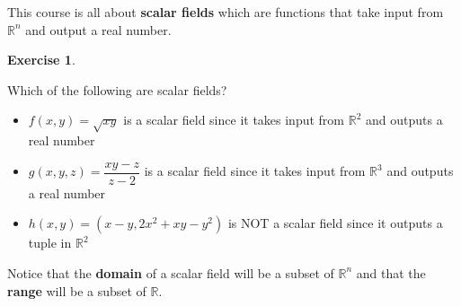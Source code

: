 \documentclass[
]{book}
\providecommand{\tightlist}{%
  \setlength{\itemsep}{0pt}\setlength{\parskip}{0pt}}
\theoremstyle{definition}
\theoremstyle{definition}
\theoremstyle{definition}
\newtheorem{exercise}{Exercise}[chapter]
\theoremstyle{definition}
\theoremstyle{remark}
\begin{document}
This course is all about \textbf{scalar fields} which are functions that take input from \(\mathbb{R}^n\) and output a real number.

\begin{exercise}
\protect\hypertarget{exr:unlabeled-div-1}{}\label{exr:unlabeled-div-1}

Which of the following are scalar fields?

\begin{itemize}
\tightlist
\item
  \(f(x,y)=\sqrt{xy}\) is a scalar field since it takes input from \(\mathbb{R}^2\) and outputs a real number
\item
  \(g(x,y,z)= \dfrac{xy-z}{z-2}\) is a scalar field since it takes input from \(\mathbb{R}^3\) and outputs a real number
\item
  \(h(x,y) = (x-y, 2x^2+xy - y^2)\) is NOT a scalar field since it outputs a tuple in \(\mathbb{R}^2\)
\end{itemize}

\end{exercise}

Notice that the \textbf{domain} of a scalar field will be a subset of \(\mathbb{R}^n\) and that the \textbf{range} will be a subset of \(\mathbb{R}\).
\end{document}
